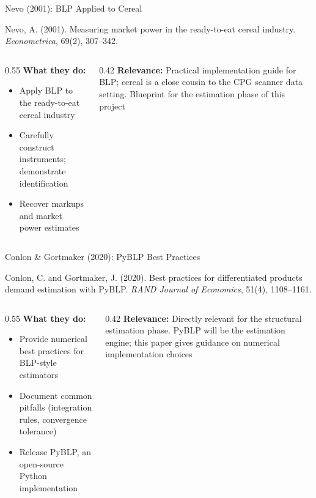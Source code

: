 \documentclass[aspectratio=169,professionalfonts]{beamer}
\newcommand{\hl}[1]{\textbf{\textcolor{UGARed}{#1}}}
\begin{document}
\begin{frame}{Nevo (2001): BLP Applied to Cereal}
  \begin{tcolorbox}[colback=red!5!white, colframe=UGARed, title=\textbf{Citation}]
    Nevo, A. (2001). Measuring market power in the ready-to-eat cereal industry.
    \textit{Econometrica}, 69(2), 307--342.
  \end{tcolorbox}
  \vspace{6pt}
  \begin{columns}[T]
    \begin{column}{0.55\textwidth}
      \hl{What they do:}
      \begin{itemize}
        \item Apply BLP to the ready-to-eat cereal industry
        \item Carefully construct instruments; demonstrate identification
        \item Recover markups and market power estimates
      \end{itemize}
    \end{column}
    \begin{column}{0.42\textwidth}
      \hl{Relevance:} Practical implementation guide for BLP; cereal is a close cousin
      to the CPG scanner data setting. Blueprint for the estimation phase of this project
    \end{column}
  \end{columns}
\end{frame}

\begin{frame}{Conlon \& Gortmaker (2020): PyBLP Best Practices}
  \begin{tcolorbox}[colback=red!5!white, colframe=UGARed, title=\textbf{Citation}]
    Conlon, C. and Gortmaker, J. (2020). Best practices for differentiated products demand
    estimation with PyBLP. \textit{RAND Journal of Economics}, 51(4), 1108--1161.
  \end{tcolorbox}
  \vspace{6pt}
  \begin{columns}[T]
    \begin{column}{0.55\textwidth}
      \hl{What they do:}
      \begin{itemize}
        \item Provide numerical best practices for BLP-style estimators
        \item Document common pitfalls (integration rules, convergence tolerance)
        \item Release PyBLP, an open-source Python implementation
      \end{itemize}
    \end{column}
    \begin{column}{0.42\textwidth}
      \hl{Relevance:} Directly relevant for the structural estimation phase. PyBLP will
      be the estimation engine; this paper gives guidance on numerical implementation choices
    \end{column}
  \end{columns}
\end{frame}
\end{document}
